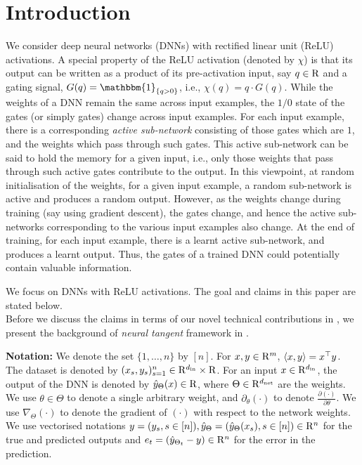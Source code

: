 \documentclass{article}
\begin{document}
\section{Introduction}
We consider deep neural networks (DNNs) with rectified linear unit (ReLU) activations. A special property of the ReLU activation (denoted by $\chi$) is that its output can be written as a product of its pre-activation input, say $q\in\mathrm{R}$ and a gating signal, $G(q)=\mathbbm{1}_{\{q>0\}}$, i.e., $\chi(q)=q\cdot G(q)$. While the weights of a DNN remain the same across input examples, the $1/0$ state of the gates (or simply gates) change across input examples. For each input example, there is a corresponding \emph{active sub-network} consisting of those gates which are $1$, and the weights which pass through such gates. This active sub-network can be said to hold the memory for a given input, i.e., only those weights that pass through such active gates contribute to the output. In this viewpoint, at random initialisation of the weights, for a given input example, a random sub-network is active and produces a random output.  However, as the weights change during training (say using gradient descent), the gates change, and hence the active sub-networks corresponding to the various input examples also change. At the end of training, for each input example, there is a learnt active sub-network, and produces a learnt output. Thus, the gates of a trained DNN could potentially contain valuable information. 

We focus on DNNs with ReLU activations. The goal and claims in this paper are stated below.\\
Before we discuss the claims in terms of our novel technical contributions in , we present the background of  \emph{neural tangent} framework in .

\textbf{Notation:} We denote the set $\{1,\ldots, n\}$ by $[n]$. For $x,y\in\mathrm{R}^m$, $\langle x,y\rangle=x^\top y$. The dataset is denoted by $(x_s,y_s)_{s=1}^n\in\mathrm{R}^{d_{\text{in}}}\times \mathrm{R}$. For an input $x\in\mathrm{R}^{d_{\text{in}}}$, the output of the DNN  is denoted by $\hat{y}_{\Theta}(x)\in\mathrm{R}$, where $\Theta\in\mathrm{R}^{d_{\text{net}}}$ are the weights. We use $\theta\in\Theta$ to denote a single arbitrary weight, and $\partial_{\theta}(\cdot)$ to denote $\frac{\partial (\cdot)}{\partial \theta}$. We use $\nabla_{\Theta}(\cdot)$ to denote the gradient of $(\cdot)$ with respect to the network weights. We use vectorised notations $y=(y_s,s\in[n]), \hat{y}_{\Theta}=\left(\hat{y}_{\Theta}(x_s), s\in[n]\right)\in\mathrm{R}^n$ for the true and predicted outputs and $e_{t}= (\hat{y}_{\Theta_t}-y)\in\mathrm{R}^n$ for the error in the prediction.
\end{document}
